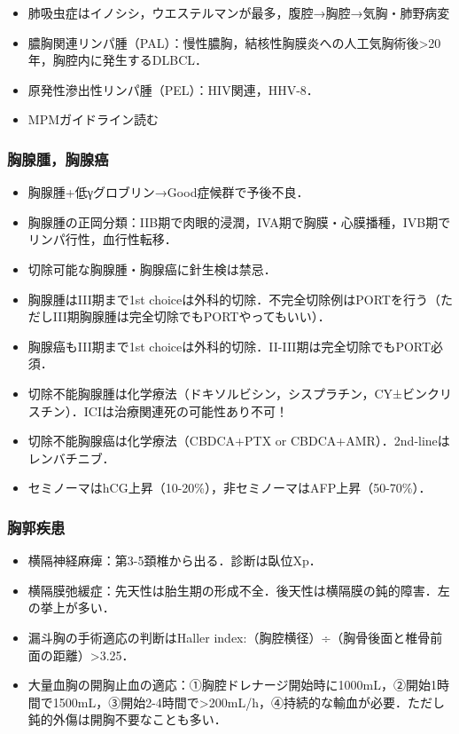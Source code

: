 \begin{itemize}
\item 肺吸虫症はイノシシ，ウエステルマンが最多，腹腔→胸腔→気胸・肺野病変
\item 膿胸関連リンパ腫（PAL）：慢性膿胸，結核性胸膜炎への人工気胸術後>20年，胸腔内に発生するDLBCL．
\item 原発性滲出性リンパ腫（PEL）：HIV関連，HHV-8．
\item MPMガイドライン読む


\end{itemize}
\subsubsection{胸腺腫，胸腺癌}
\begin{itemize}
\item 胸腺腫+低γグロブリン→Good症候群で予後不良．
\item 胸腺腫の正岡分類：IIB期で肉眼的浸潤，IVA期で胸膜・心膜播種，IVB期でリンパ行性，血行性転移．
\item 切除可能な胸腺腫・胸腺癌に針生検は禁忌．
\item 胸腺腫はIII期まで1st choiceは外科的切除．不完全切除例はPORTを行う（ただしIII期胸腺腫は完全切除でもPORTやってもいい）．


\item 胸腺癌もIII期まで1st choiceは外科的切除．II-III期は完全切除でもPORT必須．
\item 切除不能胸腺腫は化学療法（ドキソルビシン，シスプラチン，CY±ビンクリスチン）．ICIは治療関連死の可能性あり不可！
\item 切除不能胸腺癌は化学療法（CBDCA+PTX or CBDCA+AMR）．2nd-lineはレンバチニブ．








\item セミノーマはhCG上昇（10-20\%），非セミノーマはAFP上昇（50-70\%）．

\end{itemize}
\subsubsection{胸郭疾患}
\begin{itemize}
\item 横隔神経麻痺：第3-5頚椎から出る．診断は臥位Xp．
\item 横隔膜弛緩症：先天性は胎生期の形成不全．後天性は横隔膜の鈍的障害．左の挙上が多い．
\item 漏斗胸の手術適応の判断はHaller index:（胸腔横径）÷（胸骨後面と椎骨前面の距離）>3.25．


\item 大量血胸の開胸止血の適応：①胸腔ドレナージ開始時に1000mL，②開始1時間で1500mL，③開始2-4時間で>200mL/h，④持続的な輸血が必要．ただし鈍的外傷は開胸不要なことも多い．

\end{itemize}


